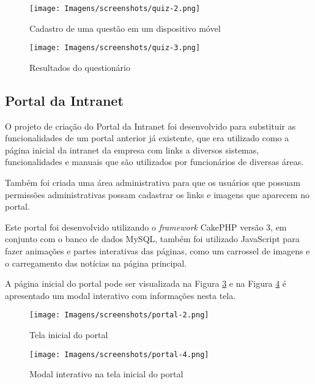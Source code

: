 \begin{figure}[htbp!]
  \centering
  \texttt{[image: Imagens/screenshots/quiz-2.png]}
  \caption{Cadastro de uma questão em um dispositivo móvel}
  \label{fig:quiz-2}
\end{figure}

\begin{figure}[htbp!]
  \centering
  \texttt{[image: Imagens/screenshots/quiz-3.png]}
  \caption{Resultados do questionário}
  \label{fig:quiz-3}
\end{figure}

\subsection{Portal da Intranet}

O projeto de criação do Portal da Intranet foi desenvolvido para substituir as funcionalidades de um portal anterior já existente, que era utilizado como a página inicial da intranet da empresa com links a diversos sistemas, funcionalidades e manuais que são utilizados por funcionários de diversas áreas.

Também foi criada uma área administrativa para que os usuários que possuam permissões administrativas possam cadastrar os links e imagens que aparecem no portal. 

Este portal foi desenvolvido utilizando o \textit{framework} CakePHP versão 3, em conjunto com o banco de dados MySQL, também foi utilizado JavaScript para fazer animações e partes interativas das páginas, como um carrossel de imagens e o carregamento das notícias na página principal.

A página inicial do portal pode ser visualizada na Figura \ref{fig:portal-1} e na Figura \ref{fig:portal-3} é apresentado um modal interativo com informações nesta tela.

\begin{figure}[htbp!]
  \centering
  \texttt{[image: Imagens/screenshots/portal-2.png]}
  \caption{Tela inicial do portal}
  \label{fig:portal-1}
\end{figure}


\begin{figure}[htbp!]
  \centering
  \texttt{[image: Imagens/screenshots/portal-4.png]}
  \caption{Modal interativo na tela inicial do portal}
  \label{fig:portal-3}
\end{figure}

